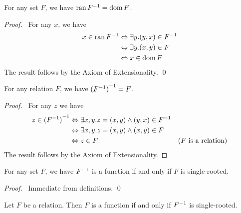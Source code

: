 \begin{theorem}
    \label{theorem:ran_inv}
    For any set $F$, we have $\operatorname{ran} {F}^{-1} = \operatorname{dom} F$.
\end{theorem}

\begin{proof}
    \pf\ For any $x$, we have
    \begin{align*}
        x \in \operatorname{ran} {F}^{-1} & \Leftrightarrow \exists y. (y,x) \in {F}^{-1} \\
        & \Leftrightarrow \exists y. (x,y) \in F \\
        & \Leftrightarrow x \in \operatorname{dom} F
    \end{align*}
    The result follows by the Axiom of Extensionality. \qed
\end{proof}

\begin{theorem}
    \label{theorem:inv_inv}
    For any relation $F$, we have ${({F}^{-1})}^{-1} = F$.
\end{theorem}

\begin{proof}
    \pf\ For any $z$ we have
    \begin{align*}
        z \in {(\ensuremath{{F}^{-1}})}^{-1} & \Leftrightarrow \exists x, y. z = (x,y) \wedge (y,x) \in {F}^{-1} \\
        & \Leftrightarrow \exists x,y. z = (x,y) \wedge (x,y) \in F \\
        & \Leftrightarrow z \in F & (\text{$F$ is a relation})
    \end{align*}
    The result follows by the Axiom of Extensionality.
\end{proof}

\begin{theorem}
    \label{theorem:inv_function}
    For any set $F$, we have ${F}^{-1}$ is a function if and only if $F$ is single-rooted.
\end{theorem}

\begin{proof}
    \pf\ Immediate from definitions. \qed
\end{proof}

\begin{theorem}
    Let $F$ be a relation. Then $F$ is a function if and only if ${F}^{-1}$ is single-rooted.
\end{theorem}

